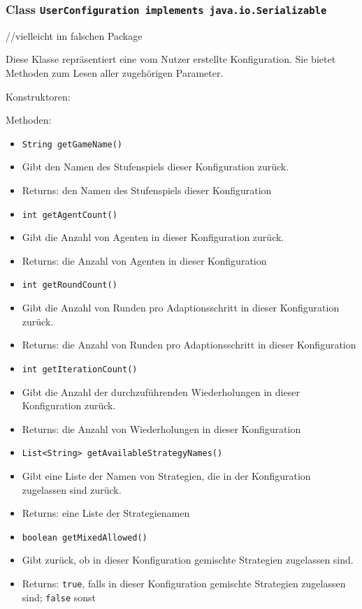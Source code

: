 \documentclass[parskip=full,11pt]{scrartcl}
\begin{document}
\subsubsection{Class \texttt{UserConfiguration implements java.io.Serializable}}
//vielleicht im falschen Package

Diese Klasse repräsentiert eine vom Nutzer erstellte Konfiguration. Sie bietet Methoden zum Lesen aller zugehörigen Parameter.

Konstruktoren:

Methoden:
\begin{itemize}\itemsep -10pt
	\item \texttt{String getGameName()}
	\item[] Gibt den Namen des Stufenspiels dieser Konfiguration zurück.
	\item[] Returns: den Namen des Stufenspiels dieser Konfiguration
	
	\item \texttt{int getAgentCount()}
	\item[] Gibt die Anzahl von Agenten in dieser Konfiguration zurück.
	\item[] Returns: die Anzahl von Agenten in dieser Konfiguration
	
	\item \texttt{int getRoundCount()}
	\item[] Gibt die Anzahl von Runden pro Adaptionsschritt in dieser Konfiguration zurück.
	\item[] Returns: die Anzahl von Runden pro Adaptionsschritt in dieser Konfiguration
	
	\item \texttt{int getIterationCount()}
	\item[] Gibt die Anzahl der durchzuführenden Wiederholungen in dieser Konfiguration zurück.
	\item[] Returns: die Anzahl von Wiederholungen in dieser Konfiguration
	
	\item \texttt{List<String> getAvailableStrategyNames()}
	\item[] Gibt eine Liste der Namen von Strategien, die in der Konfiguration zugelassen sind zurück.
	\item[] Returns: eine Liste der Strategienamen
	
	\item \texttt{boolean getMixedAllowed()}
	\item[] Gibt zurück, ob in dieser Konfiguration gemischte Strategien zugelassen sind.
	\item[] Returns: \texttt{true}, falls in dieser Konfiguration gemischte Strategien zugelassen sind; \texttt{false} sonst
	

\end{itemize}
\end{document}
